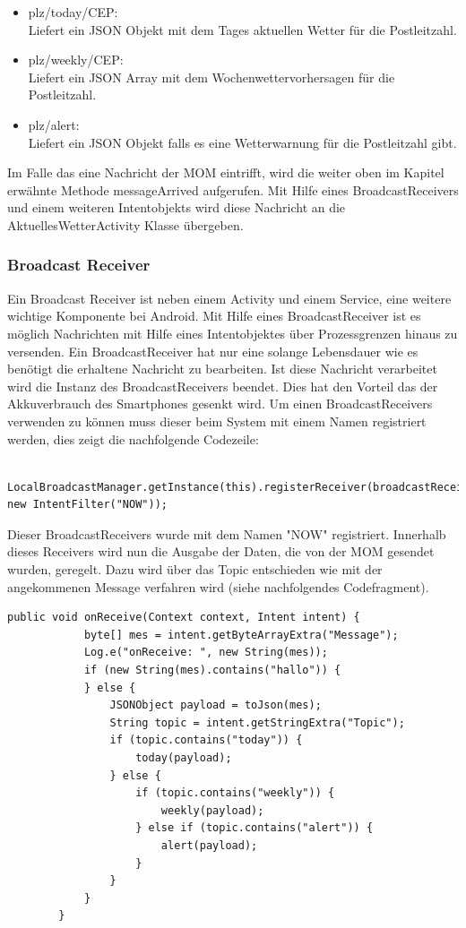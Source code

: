 \begin{itemize}
\item plz/today/CEP:
\\ Liefert ein JSON Objekt mit dem Tages aktuellen Wetter für die Postleitzahl.
\item plz/weekly/CEP:
\\ Liefert ein JSON Array mit dem Wochenwettervorhersagen für die Postleitzahl.
\item plz/alert:
\\ Liefert ein JSON Objekt falls es eine Wetterwarnung für die Postleitzahl gibt.
\end{itemize}
Im Falle das eine Nachricht der MOM eintrifft, wird die weiter oben im Kapitel erwähnte Methode messageArrived aufgerufen.
Mit Hilfe eines BroadcastReceivers und einem weiteren Intentobjekts wird diese Nachricht an die AktuellesWetterActivity Klasse übergeben.
\subsubsection{Broadcast Receiver}
\label{subsubsec:BroadcastReceiver}
Ein Broadcast Receiver ist neben einem Activity und einem Service, eine weitere wichtige Komponente bei Android. Mit Hilfe eines BroadcastReceiver ist es möglich Nachrichten mit Hilfe eines Intentobjektes über Prozessgrenzen hinaus zu versenden. Ein BroadcastReceiver hat nur eine solange Lebensdauer wie es benötigt die erhaltene Nachricht zu bearbeiten. Ist diese Nachricht verarbeitet wird die Instanz des BroadcastReceivers beendet. Dies hat den Vorteil das der Akkuverbrauch des Smartphones gesenkt wird. Um einen BroadcastReceivers verwenden zu können muss dieser beim System mit einem Namen registriert werden, dies zeigt die nachfolgende Codezeile:
\begin{lstlisting}
 LocalBroadcastManager.getInstance(this).registerReceiver(broadcastReceiver, new IntentFilter("NOW"));
  \end{lstlisting}
Dieser BroadcastReceivers wurde mit dem Namen "NOW" registriert.
Innerhalb dieses Receivers wird nun die Ausgabe der Daten, die von der MOM gesendet wurden, geregelt. Dazu wird über das Topic entschieden wie mit der angekommenen Message verfahren wird (siehe nachfolgendes Codefragment).
\begin{lstlisting}
public void onReceive(Context context, Intent intent) {
            byte[] mes = intent.getByteArrayExtra("Message");
            Log.e("onReceive: ", new String(mes));
            if (new String(mes).contains("hallo")) {
            } else {
                JSONObject payload = toJson(mes);
                String topic = intent.getStringExtra("Topic");
                if (topic.contains("today")) {
                    today(payload);
                } else {
                    if (topic.contains("weekly")) {
                        weekly(payload);
                    } else if (topic.contains("alert")) {
                        alert(payload);
                    }
                }
            }
        }
  \end{lstlisting}
  
